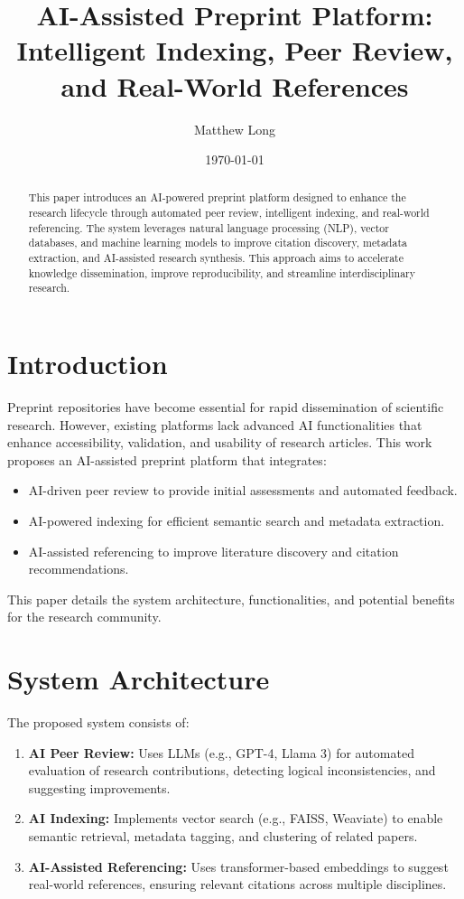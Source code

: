 \documentclass{article}
\title{AI-Assisted Preprint Platform: Intelligent Indexing, Peer Review, and Real-World References}
\author{Matthew Long}
\date{\today}
\begin{document}
\maketitle

\begin{abstract}
This paper introduces an AI-powered preprint platform designed to enhance the research lifecycle through automated peer review, intelligent indexing, and real-world referencing. The system leverages natural language processing (NLP), vector databases, and machine learning models to improve citation discovery, metadata extraction, and AI-assisted research synthesis. This approach aims to accelerate knowledge dissemination, improve reproducibility, and streamline interdisciplinary research. 
\end{abstract}

\section{Introduction}
Preprint repositories have become essential for rapid dissemination of scientific research. However, existing platforms lack advanced AI functionalities that enhance accessibility, validation, and usability of research articles. This work proposes an AI-assisted preprint platform that integrates: 
\begin{itemize}
    \item AI-driven peer review to provide initial assessments and automated feedback.
    \item AI-powered indexing for efficient semantic search and metadata extraction.
    \item AI-assisted referencing to improve literature discovery and citation recommendations.
\end{itemize}
This paper details the system architecture, functionalities, and potential benefits for the research community.

\section{System Architecture}
The proposed system consists of:
\begin{enumerate}
    \item \textbf{AI Peer Review:} Uses LLMs (e.g., GPT-4, Llama 3) for automated evaluation of research contributions, detecting logical inconsistencies, and suggesting improvements.
    \item \textbf{AI Indexing:} Implements vector search (e.g., FAISS, Weaviate) to enable semantic retrieval, metadata tagging, and clustering of related papers.
    \item \textbf{AI-Assisted Referencing:} Uses transformer-based embeddings to suggest real-world references, ensuring relevant citations across multiple disciplines.
\end{enumerate}
\end{document}
